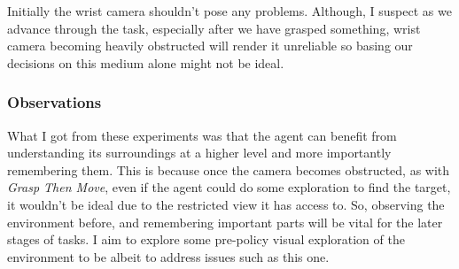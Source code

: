 
Initially the wrist camera shouldn't pose any problems. Although, I suspect as we advance through the task, especially after we have grasped something, wrist camera becoming heavily obstructed will render it unreliable so basing our decisions on this medium alone might not be ideal.


\subsubsection{Observations}
What I got from these experiments was that the agent can benefit from understanding its surroundings at a higher level and more importantly remembering them. This is because once the camera becomes obstructed, as with \emph{Grasp Then Move}, even if the agent could do some exploration to find the target, it wouldn't be ideal due to the restricted view it has access to. So, observing the environment before, and remembering important parts will be vital for the later stages of tasks. I aim to explore some pre-policy visual exploration of the environment to be albeit to address issues such as this one.

